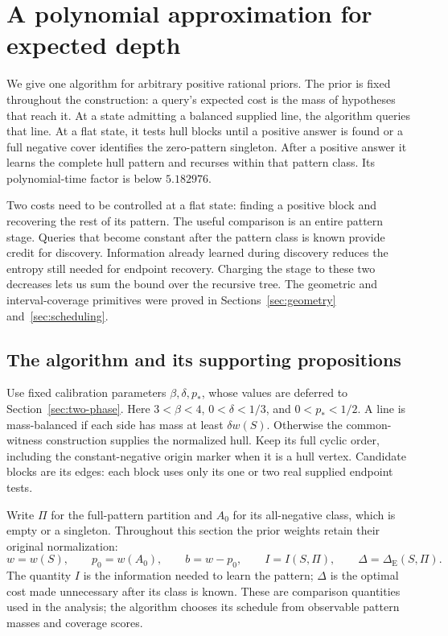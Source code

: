 \section{A polynomial approximation for expected depth}
\label{sec:mass-improvement}

We give one algorithm for arbitrary positive rational priors. The
prior is fixed throughout the construction: a query's expected cost
is the mass of hypotheses that reach it. At a state admitting a
balanced supplied line, the algorithm queries that line. At a flat
state, it tests hull blocks until a positive answer is found or a
full negative cover identifies the zero-pattern singleton. After a
positive answer it learns the complete hull pattern and recurses
within that pattern class. Its polynomial-time factor is below
$5.182976$.

Two costs need to be controlled at a flat state: finding a positive
block and recovering the rest of its pattern. The useful comparison
is an entire pattern stage. Queries that become constant after the
pattern class is known provide credit for discovery. Information
already learned during discovery reduces the entropy still needed
for endpoint recovery. Charging the stage to these two decreases
lets us sum the bound over the recursive tree. The geometric and
interval-coverage primitives were proved in
Sections~\ref{sec:geometry} and~\ref{sec:scheduling}.

\subsection{The algorithm and its supporting propositions}

Use fixed calibration parameters $\beta,\delta,p_*$, whose values are
deferred to Section~\ref{sec:two-phase}. Here
$3<\beta<4$, $0<\delta<1/3$, and $0<p_*<1/2$.
A line is mass-balanced if each side has mass at least $\delta w(S)$.
Otherwise the common-witness construction supplies the normalized hull.
Keep its full cyclic order, including the constant-negative origin
marker when it is a hull vertex. Candidate blocks are its edges: each
block uses only its one or two real supplied endpoint tests.

Write $\Pi$ for the full-pattern partition and $A_0$ for its
all-negative class, which is empty or a singleton. Throughout this
section the prior weights retain their original normalization:
\[
 w=w(S),\qquad p_0=w(A_0),\qquad b=w-p_0,\qquad
 I=I(S,\Pi),\qquad \Delta=\Delta_{\mathrm E}(S,\Pi).
\]
The quantity $I$ is the information needed to learn the pattern;
$\Delta$ is the optimal cost made unnecessary after its class is known.
These are comparison quantities used in the analysis; the algorithm
chooses its schedule from observable pattern masses and coverage scores.

